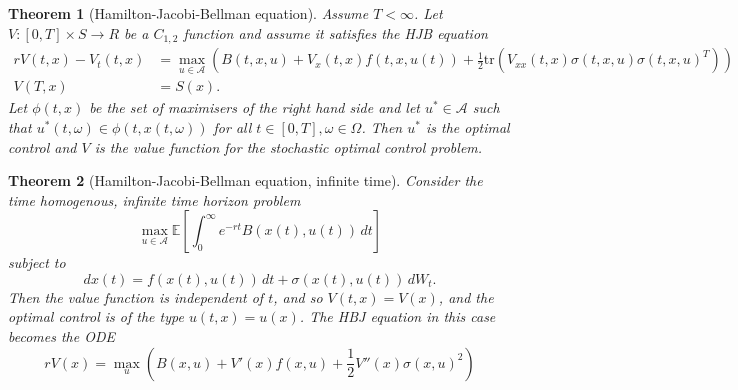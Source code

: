 \documentclass[10pt, oneside, reqno]{amsart}
\theoremstyle{plain}%
\newtheorem{thm}{Theorem}[section]
\numberwithin{equation}{section}
\theoremstyle{definition}
\theoremstyle{remark}
\newcommand{\E}{\mathbb{E}}
\begin{document}
\begin{thm}[Hamilton-Jacobi-Bellman equation]
    Assume $T < \infty$.  Let $V: [0, T] \times S \rightarrow R$ be a $C_{1, 2}$ function and assume it satisfies the HJB equation \begin{align*}
        rV(t, x) - V_t(t, x) &= \max_{u \in \mathcal A} \left(B(t, x, u) + V_x(t, x) f(t, x, u(t)) + \frac{1}{2} \text{tr}(V_{xx}(t, x) \sigma(t, x, u) \sigma(t, x, u)^T) \right) \\
        V(T, x) &= S(x).
    \end{align*}  Let $\phi(t, x)$ be the set of maximisers of the right hand side and let $u^* \in \mathcal A$ such that $u^*(t, \omega) \in \phi(t, x(t, \omega))$ for all $t \in [ 0, T], \omega \in \Omega$. Then $u^*$ is the optimal control and $V$ is the value function for the stochastic optimal control problem.  
\end{thm}

\begin{thm}[Hamilton-Jacobi-Bellman equation, infinite time]
    Consider the time homogenous, infinite time horizon problem \[
        \max_{u \in \mathcal A} \E \left[ \int_0^\infty e^{-rt} B(x(t), u(t)) \, dt \right] 
    \] subject to \[
        dx(t) = f(x(t), u(t)) \, dt + \sigma(x(t), u(t)) \, dW_t.
    \] Then the value function is independent of $t$, and so $V(t,x) = V(x)$, and the optimal control is of the type $u(t, x) = u(x)$.  The HBJ equation in this case becomes the ODE \[
        rV(x) = \max_u \left( B(x, u) + V'(x) f(x, u) + \frac{1}{2} V''(x) \sigma(x, u)^2 \right)
    \] 
\end{thm}
\end{document}
